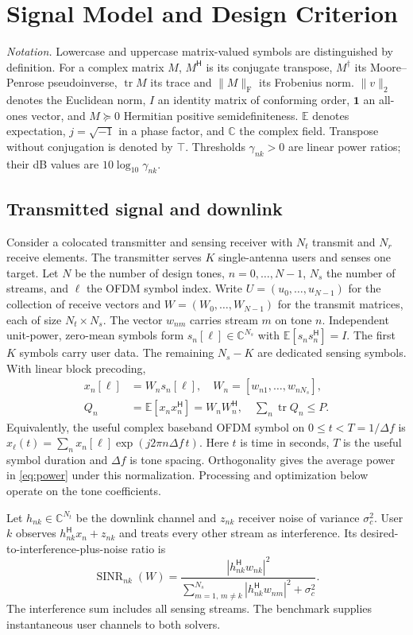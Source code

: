 \documentclass[journal]{IEEEtran}
\DeclareMathOperator{\tr}{tr}
\newcommand{\Hh}{^{\mathsf H}}
\newcommand{\F}{_{\mathrm F}}
\newcommand{\E}{\mathbb E}
\newcommand{\C}{\mathbb C}
\newcommand{\sn}{\operatorname{SINR}}
\newcommand{\norm}[1]{\lVert #1\rVert}
\begin{document}
\section{Signal Model and Design Criterion}
\emph{Notation.} Lowercase and uppercase matrix-valued symbols are distinguished by definition. For a complex matrix $M$, $M^{\mathsf H}$ is its conjugate transpose, $M^\dagger$ its Moore--Penrose pseudoinverse, $\tr M$ its trace and $\norm M\F$ its Frobenius norm. $\norm v_2$ denotes the Euclidean norm, $I$ an identity matrix of conforming order, $\mathbf1$ an all-ones vector, and $M\succeq0$ Hermitian positive semidefiniteness. $\mathbb E$ denotes expectation, $j=\sqrt{-1}$ in a phase factor, and $\mathbb C$ the complex field. Transpose without conjugation is denoted by $\top$. Thresholds $\gamma_{nk}>0$ are linear power ratios; their dB values are $10\log_{10}\gamma_{nk}$.
\subsection{Transmitted signal and downlink}
Consider a colocated transmitter and sensing receiver with $N_t$ transmit and $N_r$ receive elements. The transmitter serves $K$ single-antenna users and senses one target. Let $N$ be the number of design tones, $n=0,\ldots,N-1$, $N_s$ the number of streams, and $\ell$ the OFDM symbol index. Write $U=(u_0,\ldots,u_{N-1})$ for the collection of receive vectors and $W=(W_0,\ldots,W_{N-1})$ for the transmit matrices, each of size $N_t\times N_s$. The vector $w_{nm}$ carries stream $m$ on tone $n$. Independent unit-power, zero-mean symbols form $s_n[\ell]\in\C^{N_s}$ with $\E[s_ns_n\Hh]=I$. The first $K$ symbols carry user data. The remaining $N_s-K$ are dedicated sensing symbols. With linear block precoding,
\begin{align}
 x_n[\ell]&=W_n s_n[\ell],\quad W_n=[w_{n1},\ldots,w_{nN_s}],\\
 Q_n&=\E[x_nx_n\Hh]=W_nW_n\Hh,\quad
 \sum_n\tr Q_n\le P. \label{eq:power}
\end{align}
Equivalently, the useful complex baseband OFDM symbol on $0\le t<T=1/\Delta f$ is $x_\ell(t)=\sum_n x_n[\ell]\exp(j2\pi n\Delta f\,t)$. Here $t$ is time in seconds, $T$ is the useful symbol duration and $\Delta f$ is tone spacing. Orthogonality gives the average power in \eqref{eq:power} under this normalization. Processing and optimization below operate on the tone coefficients.

Let $h_{nk}\in\C^{N_t}$ be the downlink channel and $z_{nk}$ receiver noise of variance $\sigma_c^2$. User $k$ observes $h_{nk}\Hh x_n+z_{nk}$ and treats every other stream as interference. Its desired-to-interference-plus-noise ratio is
\begin{equation}
 \sn_{nk}(W)=\frac{|h_{nk}\Hh w_{nk}|^2}
 {\sum_{m=1,\,m\ne k}^{N_s}|h_{nk}\Hh w_{nm}|^2+\sigma_c^2}.
 \label{eq:sinr}
\end{equation}
The interference sum includes all sensing streams. The benchmark supplies instantaneous user channels to both solvers.
\end{document}

